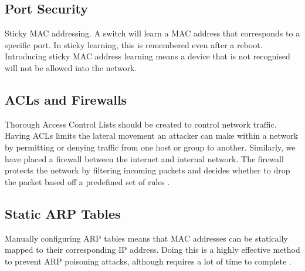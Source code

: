 \subsection{Port Security}
Sticky MAC addressing. A switch will learn a MAC address that corresponds to a specific port. In sticky learning, this is remembered even after a reboot. Introducing sticky MAC address learning means a device that is not recognised will not be allowed into the network.
\subsection{ACLs and Firewalls}
Thorough Access Control Lists should be created to control network traffic. Having ACLs limits the lateral movement an attacker can make within a network by permitting or denying traffic from one host or group to another. Similarly, we have placed a firewall between the internet and internal network. The firewall protects the network by filtering incoming packets and decides whether to drop the packet based off a predefined set of rules \parencite{cisco-firewall}.
\subsection{Static ARP Tables}
Manually configuring ARP tables means that MAC addresses can be statically mapped to their corresponding IP address. Doing this is a highly effective method to prevent ARP poisoning attacks, although requires a lot of time to complete \parencite{arp-posioning}.